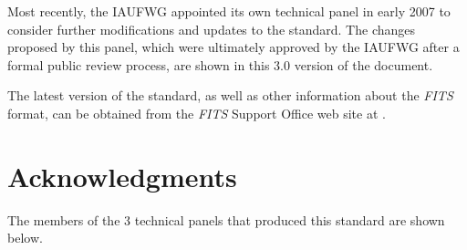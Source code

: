 \documentclass[11pt,makeidx]{book}     %
\begin{document}
Most recently, the IAUFWG  appointed
its own technical panel in early 2007 to consider further modifications and updates
to the standard.  The changes proposed by this panel, which were ultimately approved
by the IAUFWG after a formal public review process, are shown in this 
3.0 version of the document.

The latest version of the standard, as well as other information about
the {\em FITS\/} format, can be obtained from the {\em FITS\/} Support
Office web site at
.

\newpage
\section{Acknowledgments}


The members of the 3 technical panels that produced this standard are shown below.  
\end{document}
